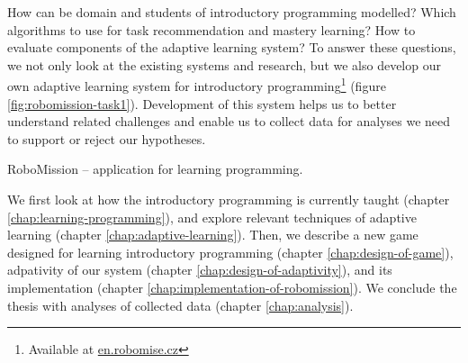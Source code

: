How can be domain and students of introductory programming modelled?
Which algorithms to use for task recommendation and mastery learning?
How to evaluate components of the adaptive learning system?
To answer these questions, we not only look at the existing systems
and research, but we also develop our own adaptive learning system for
introductory programming\footnote{Available at \url{en.robomise.cz}}
(figure \ref{fig:robomission-task1}).
Development of this system helps us to better understand related challenges
and enable us to collect data for analyses we need to support or reject our hypotheses.

%
  {RoboMission -- application for learning programming.}

We first look at how the introductory programming is currently taught
(chapter \ref{chap:learning-programming}),
and explore relevant techniques of adaptive learning (chapter \ref{chap:adaptive-learning}).
Then, we describe a new game designed for learning introductory programming
(chapter \ref{chap:design-of-game}),
adpativity of our system (chapter \ref{chap:design-of-adaptivity}),
and its implementation (chapter \ref{chap:implementation-of-robomission}).
We conclude the thesis with analyses of collected data
(chapter \ref{chap:analysis}).
